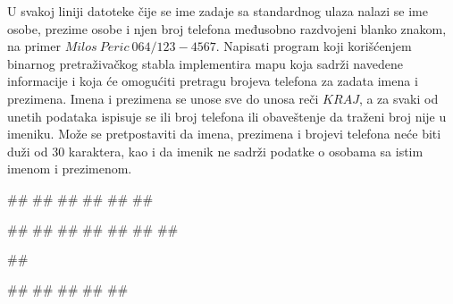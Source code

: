 \begin{Answer}[ref=4_15]
\end{Answer}


\begin{Exercise}[label=4_16]
U svakoj liniji datoteke čije se ime zadaje sa standardnog ulaza nalazi se ime osobe, prezime osobe i njen broj telefona međusobno razdvojeni blanko znakom, na primer $Milos\ Peric\ 064/123-4567$.  Napisati program koji korišćenjem binarnog pretraživačkog stabla implementira mapu koja sadrži navedene informacije i koja će omogućiti pretragu brojeva telefona za zadata imena i prezimena. Imena i prezimena se unose sve do unosa reči $KRAJ$, a za svaki od unetih podataka ispisuje se ili broj telefona ili obaveštenje da traženi broj nije u imeniku. Može se pretpostaviti da imena, prezimena i brojevi telefona neće biti duži od $30$ karaktera, kao i da imenik ne sadrži podatke o osobama sa istim imenom i prezimenom.

\begin{miditest}
\begin{upotreba}{1}
##  
##
##
##
##
##
          
#\naslovInt#
##
##	
##
##
##
##
\end{upotreba}
\end{miditest}
\begin{miditest}
\begin{upotreba}{2}
##
  
#\naslovInt#
##
#\naslovIzlazZaGresku#
##
##
\end{upotreba}
\end{miditest}
\end{Exercise}

\begin{Answer}[ref=4_16]
\end{Answer}


